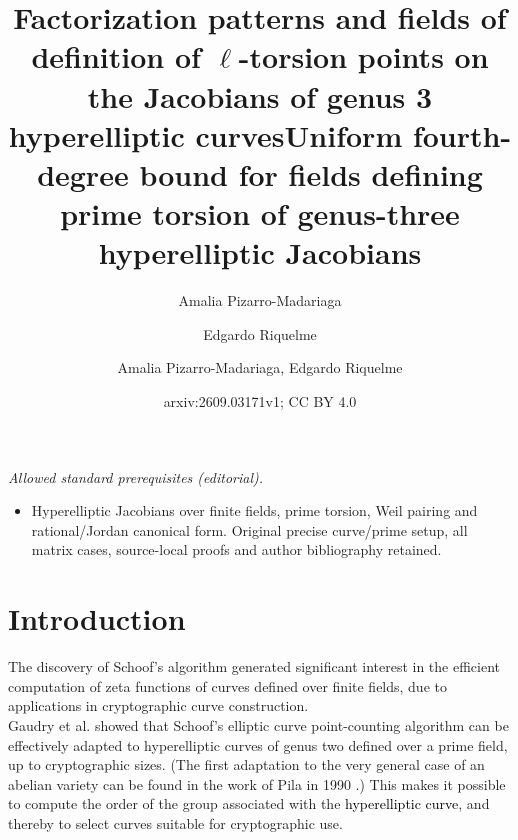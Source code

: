 \documentclass[11pt,a4paper]{article}
\title{Factorization patterns and fields of definition of $\ell$-torsion points on the Jacobians of genus 3 
hyperelliptic curves}
\author{Amalia Pizarro-Madariaga}
\affil{Instituto de Matemáticas, Universidad del Valpara\'iso, Chile}
\author{Edgardo Riquelme}
\affil{Departamento de Ciencias Básicas, Universidad del B\'io-B\'io, Chile}
\title{Uniform fourth-degree bound for fields defining prime torsion of genus-three hyperelliptic Jacobians}
\author{Amalia Pizarro-Madariaga, Edgardo Riquelme}
\date{arxiv:2609.03171v1; CC BY 4.0}
\theoremstyle{plain}
\theoremstyle{definition}
\theoremstyle{remark}
\newcommand{\azul}[1]{\textcolor{black}{#1}}
\begin{document}
\maketitle
\noindent\textit{Allowed standard prerequisites (editorial).}\begin{itemize}
\item Hyperelliptic Jacobians over finite fields, prime torsion, Weil pairing and rational/Jordan canonical form. Original precise curve/prime setup, all matrix cases, source-local proofs and author bibliography retained.
\end{itemize}\medskip
\section{Introduction}
The discovery of Schoof's algorithm \cite{rs} generated significant interest in the efficient computation of zeta functions of curves defined over finite fields, due to applications in cryptographic curve construction.\\
Gaudry et al. \cite{GS00, GS04, GS12} showed that Schoof's elliptic curve point-counting algorithm \cite{rs} can be effectively adapted to hyperelliptic curves of genus two defined over a prime field, up to cryptographic sizes. (The first adaptation to the very general case of an abelian variety can be found in the work of Pila in 1990 \cite{Pila}.) This makes it possible to compute the order of the group associated with the \azul{hyperelliptic curve}, and thereby to select curves suitable for cryptographic use.\\
\end{document}
